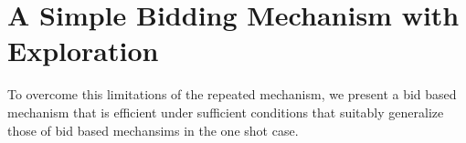 











\section{A Simple Bidding Mechanism with Exploration}

To overcome this limitations of the repeated mechanism, we present a bid based mechanism that is efficient under sufficient conditions that suitably generalize those of bid based mechansims in the one shot case. 

